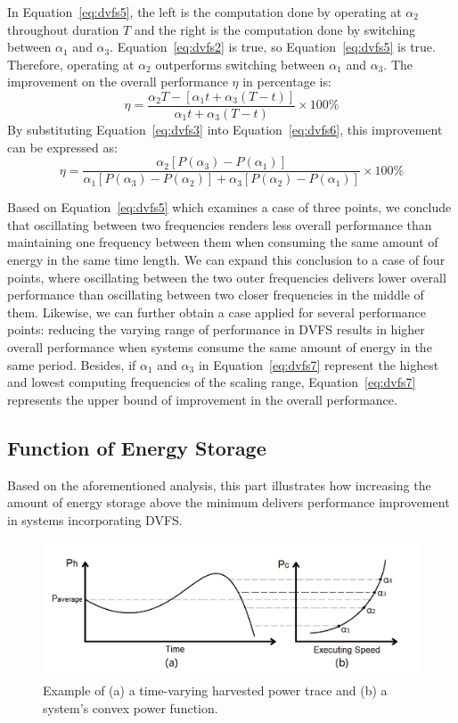 In Equation~\ref{eq:dvfs5}, the left is the computation done by operating at $\alpha_2$ throughout duration $T$ and the right is the computation done by switching between $\alpha_1$ and $\alpha_3$. Equation~\ref{eq:dvfs2} is true, so Equation~\ref{eq:dvfs5} is true. Therefore, operating at $\alpha_2$ outperforms switching between $\alpha_1$ and $\alpha_3$. The improvement on the overall performance $\eta$ in percentage is: 
\begin{equation} \label{eq:dvfs6}
    \eta = \frac{\alpha_2 T - [\alpha_1 t + \alpha_3 (T - t)]}{\alpha_1 t + \alpha_3 (T - t)} \times 100\%
\end{equation}
By substituting Equation~\ref{eq:dvfs3} into Equation~\ref{eq:dvfs6}, this improvement can be expressed as:
\begin{equation} \label{eq:dvfs7}
    \eta = \frac{\alpha_2 [P(\alpha_3) - P(\alpha_1)]}{\alpha_1 [P(\alpha_3) - P(\alpha_2)] + \alpha_3 [P(\alpha_2) - P(\alpha_1)]} \times 100\%
\end{equation}

Based on Equation~\ref{eq:dvfs5} which examines a case of three points, we conclude that oscillating between two frequencies renders less overall performance than maintaining one frequency between them when consuming the same amount of energy in the same time length. We can expand this conclusion to a case of four points, where oscillating between the two outer frequencies delivers lower overall performance than oscillating between two closer frequencies in the middle of them. Likewise, we can further obtain a case applied for several performance points: reducing the varying range of performance in DVFS results in higher overall performance when systems consume the same amount of energy in the same period. Besides, if $\alpha_1$ and $\alpha_3$ in Equation~\ref{eq:dvfs7} represent the highest and lowest computing frequencies of the scaling range, Equation~\ref{eq:dvfs7} represents the upper bound of improvement in the overall performance.

\subsection{Function of Energy Storage}

Based on the aforementioned analysis, this part illustrates how increasing the amount of energy storage above the minimum delivers performance improvement in systems incorporating DVFS.

\begin{figure}[!tb]
    \centering
    \includegraphics[width=12cm]{figure/work2/pnanalysis}
    \caption{Example of (a) a time-varying harvested power trace and (b) a system's convex power function.}
    \label{Figure:pnanalysis}
\end{figure} 


